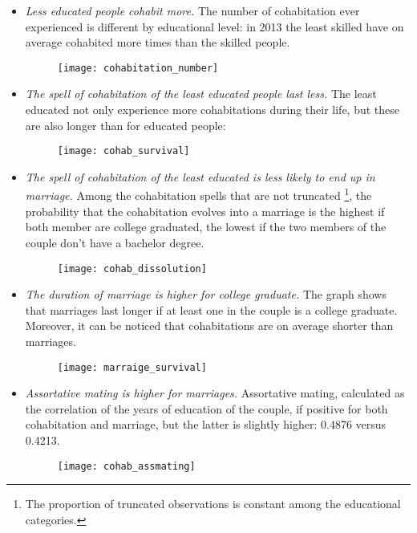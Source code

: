 \documentclass[12pt]{article}
\begin{document}
\begin{itemize}
	\item \textit{Less educated people cohabit more.} The number of cohabitation ever experienced is different by educational level: in 2013 the least skilled have on average cohabited more times than the skilled people.
	\begin{figure}[H]
\centering
\texttt{[image: cohabitation\_number]}
\caption{}
\label{fig:cohabitationnumber}
\end{figure}
\bigskip
	\item\textit{The spell of cohabitation of the least educated people last less.} The least educated not only experience  more cohabitations during their life, but these are also longer than for educated people:
	\begin{figure}[H]
\centering
\texttt{[image: cohab\_survival]}
\caption{}
\label{fig:cohabsurvival}
\end{figure}
	\item\textit{The spell of cohabitation of the least educated is less likely to end up in marriage.} Among the cohabitation spells that are not truncated \footnote{The proportion of truncated observations is constant among the educational categories.}, the probability that the cohabitation evolves into a marriage is the highest if both member are college graduated, the lowest if the two members of the couple don't have a bachelor degree.
	\begin{figure}[H]
\centering
\texttt{[image: cohab\_dissolution]}
\caption{}
\label{fig:cohabdissolution}
\end{figure}
	\item\textit{The duration of marriage is higher for college graduate.} The graph shows that marriages last longer if at least one in the couple is a college graduate. Moreover, it can be noticed that cohabitations are on average shorter than marriages.
	\begin{figure}[h]
\centering
\texttt{[image: marraige\_survival]}
\caption{}
\label{fig:marraigesurvival}
\end{figure}
	\item\textit{Assortative mating is higher for marriages.} Assortative mating, calculated as the correlation of the years of education of the couple, if positive for both cohabitation and marriage, but the latter is slightly higher: 0.4876 versus 0.4213.
\begin{figure}[H]
\centering
\texttt{[image: cohab\_assmating]}

\end{figure}
\end{itemize}
\end{document}
